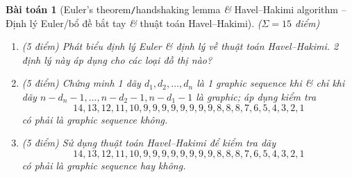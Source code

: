 \documentclass{article}
\newtheorem{baitoan}{Bài toán}
\begin{document}
\begin{baitoan}[Euler's theorem{\tt/}handshaking lemma {\it\&} Havel--Hakimi algorithm -- Định lý Euler/bổ đề bắt tay {\it\&} thuật toán Havel--Hakimi]
	{\rm($\Sigma = 15$ điểm)}
	\begin{enumerate}[label=(\alph*)]
		\item {\rm(5 điểm)} Phát biểu định lý Euler \& định lý về thuật toán Havel--Hakimi. 2 định lý này áp dụng cho các loại đồ thị nào?
		\item {\rm(5 điểm) \cite[P10.1.13, p. 368]{Shahriari2022}} Chứng minh 1 dãy $d_1,d_2,\ldots,d_n$ là 1 graphic sequence khi \& chỉ khi dãy $n - d_n - 1,\ldots,n - d_2 - 1,n - d_1 - 1$ là graphic; áp dụng kiểm tra
		\begin{equation*}
			14,13,12,11,10,9,9,9,9,9,9,9,9,8,8,8,7,6,5,4,3,2,1
		\end{equation*}
		có phải là graphic sequence không.
		\item {\rm(5 điểm)} Sử dụng thuật toán Havel--Hakimi để kiểm tra dãy
		\begin{equation*}
			14,13,12,11,10,9,9,9,9,9,9,9,9,8,8,8,7,6,5,4,3,2,1
		\end{equation*}
		có phải là graphic sequence hay không.
	\end{enumerate}
\end{baitoan}
\end{document}
